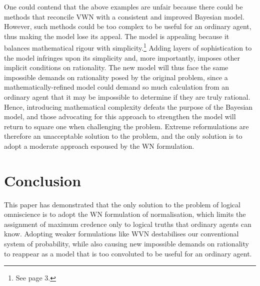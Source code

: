 \documentclass[12pt]{article}
\begin{document}
One could contend that the above examples are unfair because there could be methods that reconcile VWN with a consistent and improved Bayesian model. However, such methods could be too complex to be useful for an ordinary agent, thus making the model lose its appeal. The model is appealing because it balances mathematical rigour with simplicity.\footnote{See page 3.} Adding layers of sophistication to the model infringes upon its simplicity and, more importantly, imposes other implicit conditions on rationality. The new model will thus face the same impossible demands on rationality posed by the original problem, since a mathematically-refined model could demand so much calculation from an ordinary agent that it may be impossible to determine if they are truly rational. Hence, introducing mathematical complexity defeats the purpose of the Bayesian model, and those advocating for this approach to strengthen the model will return to square one when challenging the problem. Extreme reformulations are therefore an unacceptable solution to the problem, and the only solution is to adopt a moderate approach espoused by the WN formulation.
\section{Conclusion}
This paper has demonstrated that the only solution to the problem of logical omniscience is to adopt the WN formulation of normalisation, which limits the assignment of maximum credence only to logical truths that ordinary agents can know. Adopting weaker formulations like WVN destabilises our conventional system of probability, while also causing new impossible demands on rationality to reappear as a model that is too convoluted to be useful for an ordinary agent.
\pagebreak
\printbibliography
\end{document}
